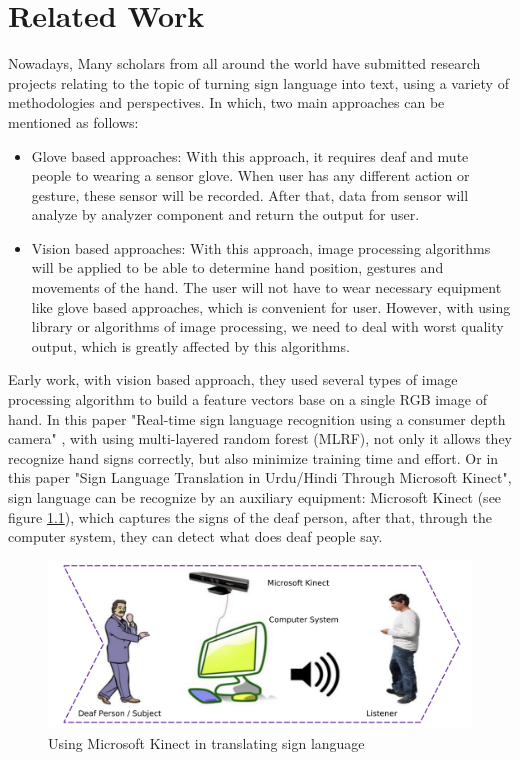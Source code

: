 \chapter{Related Work}
  Nowadays, Many scholars from all around the world have submitted research 
  projects relating to the topic of turning sign language into text, 
  using a variety of methodologies and perspectives.
  In which, two main approaches can be mentioned as follows:
  \begin{itemize}
    \item Glove based approaches:
    With this approach, it requires deaf and mute people to wearing a sensor glove. When user
    has any different action or gesture, these sensor will be recorded. After that, data from
    sensor will analyze by analyzer component and return the output for user.
    \item Vision based approaches:
    With this approach, image processing algorithms will be applied to be able to determine
    hand position, gestures and movements of the hand. The user will not have to wear necessary
    equipment like glove based approaches, which is convenient for user. However, with using
    library or algorithms of image processing, we need to deal with worst quality output, which is
    greatly affected by this algorithms.
  \end{itemize}

  Early work, with vision based approach, they used several types of
  image processing algorithm to build a feature vectors base on a single RGB image of hand.
  In this paper "Real-time sign language recognition using a consumer depth camera" \cite{kuznetsova2013real},
  with using multi-layered random forest (MLRF), not only it allows they recognize hand signs
  correctly, but also minimize training time and effort. Or in this paper "Sign Language Translation in Urdu/Hindi Through
  Microsoft Kinect", sign language can be recognize by an auxiliary equipment: Microsoft Kinect (see figure \ref{fig:Chap2-MS-Kinect}), which captures
  the signs of the deaf person, after that, through the computer system, they can detect what does deaf people say.

  \begin{figure}[H]
    \centering
    \includegraphics[width=\textwidth]{img/Chap2/MS-Kinect.png}
    \caption{Using Microsoft Kinect in translating sign language}
    \label{fig:Chap2-MS-Kinect}
  \end{figure}

